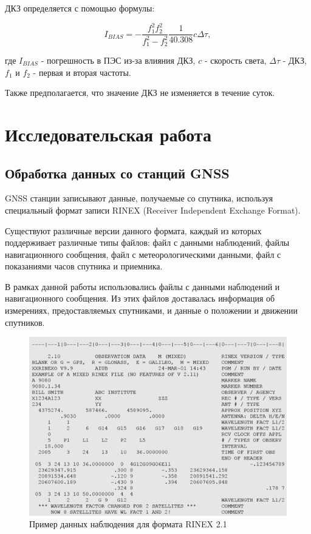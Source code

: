 \documentclass[14pt]{article}
\begin{document}
ДКЗ определяется с помощью формулы:

\begin{equation}
I_{BIAS} = -\frac{f_1^2 f_2^2}{f_1^2 - f_2^2} \frac{1}{40.308} c\Delta \tau,
\end{equation}

где $I_{BIAS}$ - погрешность в ПЭС из-за влияния ДКЗ, $c$ - скорость света, $\Delta\tau$ - ДКЗ, $f_1$ и $f_2$ - первая и вторая частоты.

Также предполагается, что значение ДКЗ не изменяется в течение суток.

\section{Исследовательская работа}
\subsection{Обработка данных со станций GNSS}
 GNSS станции записывают данные, получаемые со спутника, используя специальный формат записи RINEX (Receiver Independent Exchange Format).
 
 Существуют различные версии данного формата, каждый из которых поддерживает различные типы файлов: файл с данными наблюдений, файлы навигационного сообщения, файл с метеорологическими данными, файл с показаниями часов спутника и приемника.
 
 В рамках данной работы использовались файлы с данными наблюдений и навигационного сообщения. Из этих файлов доставалась информация об измерениях, предоставляемых спутниками, и данные о положении и движении спутников.
  
\begin{figure}[h!]
\centering
\includegraphics[width = 0.6\linewidth]{pics/rinex_obs.png}
\caption{Пример данных наблюдения для формата RINEX 2.1}
\end{figure}
\end{document}
